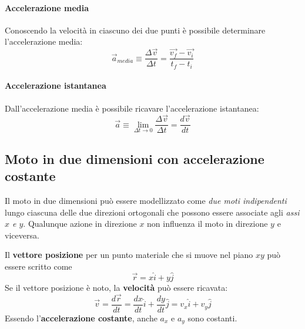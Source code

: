 \documentclass[a4paper,11pt,oneside]{book}
\begin{document}
\paragraph{Accelerazione media}
Conoscendo la velocità in ciascuno dei due punti è possibile determinare l'accelerazione media:
\begin{equation*}
    \vec{a}_{media} \equiv \frac{\Delta \vec{v}}{\Delta t} = \frac{\vec{v_f} - \vec{v_i}}{t_f - t_i}
\end{equation*}

\paragraph{Accelerazione istantanea}
Dall'accelerazione media è possibile ricavare l'accelerazione istantanea:
\begin{equation*}
    \vec{a} \equiv \lim_{\Delta t \to 0} \frac{\Delta \vec{v}}{\Delta t} = \frac{d\vec{v}}{dt}
\end{equation*}

\newpage
\subsection{Moto in due dimensioni con accelerazione costante}
Il moto in due dimensioni può essere modellizzato come \emph{due moti indipendenti} lungo
ciascuna delle due direzioni ortogonali che possono essere associate agli \emph{assi $x$ e $y$}.
Qualunque azione in direzione $x$ non influenza il moto in direzione $y$ e viceversa.

\begin{figure}[h]
    \centering
\end{figure}
\noindent Il \textbf{vettore posizione} per un punto materiale che si muove nel piano $xy$ può essere scritto come
\begin{equation*}
    \vec{r} = x\hat{i} + y\hat{j}
\end{equation*}
Se il vettore posizione è noto, la \textbf{velocità} può essere ricavata:
\begin{equation*}
    \vec{v} = \frac{d\vec{r}}{dt} = \frac{dx}{dt}\hat{i}+\frac{dy}{dt}\hat{j} = v_x \hat{i} + v_y \hat{j}
\end{equation*}
Essendo l'\textbf{accelerazione costante}, anche $a_x$ e $a_y$ sono costanti.
\end{document}
